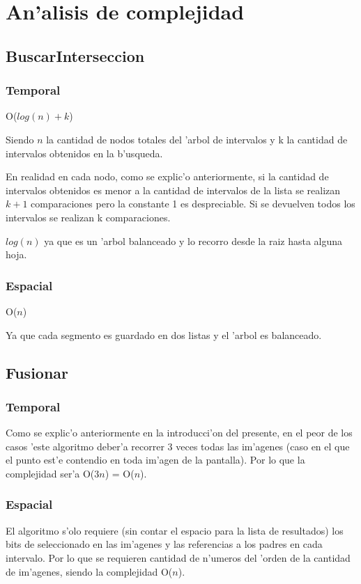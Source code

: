 \section{An'alisis de complejidad}
\subsection{BuscarInterseccion}
\subsubsection{Temporal}
O($log(n)+k$)

Siendo $n$ la cantidad de nodos totales del 'arbol de intervalos y k la cantidad de intervalos obtenidos en la b'usqueda. 

En realidad en cada nodo, como se explic'o anteriormente, si la cantidad de intervalos obtenidos es menor a la cantidad de intervalos de la lista se realizan $k+1$ comparaciones pero la constante 1 es despreciable. Si se devuelven todos los intervalos se realizan k comparaciones.

$log(n)$ ya que es un 'arbol balanceado y lo recorro desde la raiz hasta alguna hoja.

\subsubsection{Espacial}
O($n$)

Ya que cada segmento es guardado en dos listas y el 'arbol es balanceado.

\subsection{Fusionar}
\subsubsection{Temporal}
Como se explic'o anteriormente en la introducci'on del presente, en el peor de los casos 'este algoritmo deber'a recorrer 3 veces todas las im'agenes (caso en el que el punto est'e contendio en toda im'agen de la pantalla). Por lo que la complejidad ser'a O($3n$) = O($n$).

\subsubsection{Espacial}
El algoritmo s'olo requiere (sin contar el espacio para la lista de resultados) los bits de seleccionado en las im'agenes y las referencias a los padres en cada intervalo. Por lo que se requieren cantidad de n'umeros del 'orden de la cantidad de im'agenes, siendo la complejidad O($n$).
